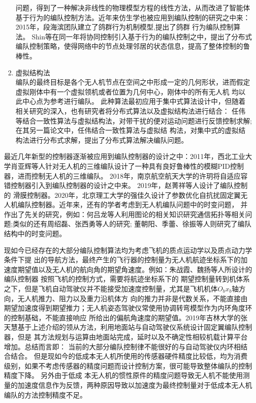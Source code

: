 \begin{enumerate}
        问题，得到了一种解决非线性的物理模型方程的线性方法，从而改进了智能体基于行为的编队控制方法。\cite{SongYunZhong2012}近年来仿生学也被应用到编队控制的研究之中来：2015年，段海滨团队建立了鸽群行为机制模型,提出了鸽群
        行为编队控制算法。\cite{DuanHaiBin2015}
        Shin等在同一年将协同控制引入基于行为的编队控制之中，提出了分布式编队控制策略，使得网络中的节点处理邻居的状态信息，提高了整体控制的鲁棒性。\cite{Jongho2015}
    \item 虚拟结构法\\
        编队的最终目标是各个无人机节点在空间之中形成一定的几何形状，进而假定虚拟刚体中有一个虚拟领机或者位置为几何中心，刚体中的所有无人机
        均以此中心点为参考进行编队。\cite{Lewis1997High}
        此种算法最初应用于集中式算法设计中，但随着相关研究的深入，也有研究者将分布式算法以及虚拟结构法进行结合：
        任伟等结合一致性算法与虚拟结构法，对带干扰的便对运动问题进行反馈控制求解\cite{Ren2004Formation};在其另一篇论文中，任伟结合一致性算法与虚拟结
        构法，对集中式的虚拟结构法进行分布式求解，提出了分布式算法解决编队问题。\cite{Ren2004Decentralized}
\end{enumerate}

最近几年新型的控制器逐渐被应用到编队控制器的设计之中：2011年，西北工业大学肖亚辉等人针对无人机的三维编队设计了一种具有良好鲁棒性的模糊PID控制器，进而控制无人机的三维编队。\cite{XiaoYaHui2011}
2018年，南京航空航天大学的许玥将自适应容错控制器引入到编队控制器的设计之中来。\cite{XuYue} 2019年，赵菁祥等人设计了编队控制的
滑膜控制器。2020年，北京理工大学的强佳久设计了参数优化自抗扰固定翼无人机编队控制器。\cite{MengXiuyun2020}近年来，还有的学者考虑到无人机编队问题中的时变问题，
并作出了先关的研究，例如：何吕龙等人利用图论的相关知识研究通信拓扑等相关问题\cite{Helvlong2020};类似的还有周绍磊\cite{Zhoushaolei2020}、张西勇\cite{Zhangxiyong2019}等人的研究;
董朝阳\cite{Dongzhaoyang2020}、季蕾\cite{Jilei2019}、徐振\cite{Xuzhen2019}等人则研究了编队结构中的时变问题。

现如今已经存在的大部分编队控制算法均为考虑飞机的质点运动学以及质点动力学条件下提
出的导航方法，最终产生的飞行器的控制量为无人机航迹坐标系下的加速度期望值以及无人机的航向角的期望角速度。例如：朱战霞、魏扬等人所设计的编队控制器
按照飞机的控制方式，需要将航迹坐标系下的
期望控制量转到机体系之下，但是飞机自动驾驶仪并不能接受加速度控制量，尤其是飞机机体$O_bx_b$轴方向，无人机推力、阻力以及重力沿机体方
向的推力并非是代数关系，不能直接由期望加速度得到期望推力；无人机姿态驾驶仪常使用协调转弯模型作为内环角度环的控制基础，不能直接响应
所给出的偏航角速度的期望值。2019年吉林大学的张天慧基于上述介绍的领从方法，利用地面站与自动驾驶仪系统设计固定翼编队控制器，\cite{Zhangtianhui2019}但是
其方法规划与运算由地面站完成，延时以及不确定性相较机载计算平台增加。总结而言即：
当前的大部分编队控制律不能很好的与自动驾驶仪内环相结合结合。
但是现如今的低成本无人机所使用的传感器硬件精度比较低，均为消费级别，如果不考虑传感器的精度问题而设计控制方案，很可能导致整体编队的控制精度下降。
另外由于低成
本无人机的惯性原件的精度问题导致无人机不能使用测量的加速度信息作为反馈，两种原因导致以加速度为最终控制量对于低成本无人机编队的方法控制精度不足。
